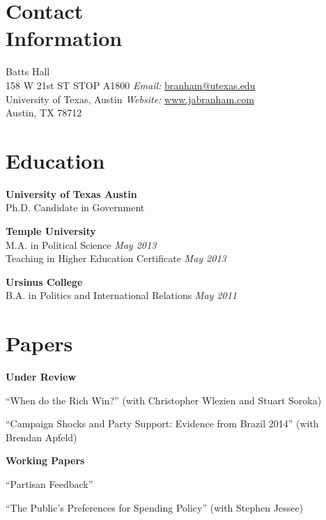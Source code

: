 \documentclass[margin,line]{res}
\newenvironment{list2}{
    \begin{list}{--}{%
        \setlength{\itemsep}{0in}
        \setlength{\parsep}{0in} \setlength{\parskip}{0in}
        \setlength{\topsep}{0in} \setlength{\partopsep}{0in}
        \setlength{\leftmargin}{0.2in}}}{\end{list}}
\begin{document}

\begin{resume}


\section{\sc Contact \\Information}
Batts Hall \hfill     \\
158 W 21st ST STOP A1800 \hfill \emph{Email:} \href{mailto:branham@utexas.edu}{branham@utexas.edu} \\
University of Texas, Austin \hfill \emph{Website:} \href{www.jabranham.com}{www.jabranham.com} \\
Austin, TX 78712 \hfill


\section{\sc Education}
\textbf{University of Texas Austin}     \hfill     \\
 Ph.D. Candidate in Government       \hfill 

\textbf{Temple University} \hfill  \\
M.A. in Political Science  \hfill     \emph{May 2013} \\
Teaching in Higher Education Certificate \hfill \emph{May 2013}

\textbf{Ursinus College}   \hfill     \\ 
B.A. in Politics and International Relations    \hfill      \emph{May 2011} \\

\section{\sc Papers}
\textbf{Under Review}
\begin{list2}
\item ``When do the Rich Win?'' (with Christopher Wlezien and Stuart Soroka)
\item ``Campaign Shocks and Party Support: Evidence from Brazil 2014''
  (with Brendan Apfeld)
\end{list2}

\textbf{Working Papers}
\begin{list2}
  \item ``Partisan Feedback''
  \item ``The Public's Preferences for Spending Policy'' (with Stephen
    Jessee)
\end{list2}


\end{resume}
\end{document}
